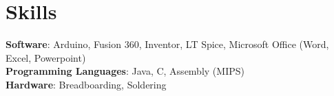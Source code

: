 \section{Skills}
 \begin{itemize}[leftmargin=0.15in, label={}]
    \small{\item{
     \textbf{Software}{: Arduino, Fusion 360, Inventor, LT Spice, Microsoft Office (Word, Excel, Powerpoint)} \\
     \textbf{Programming Languages}{: Java, C, Assembly (MIPS)} \\
     \textbf{Hardware}{: Breadboarding, Soldering}
    }}
 \end{itemize}
